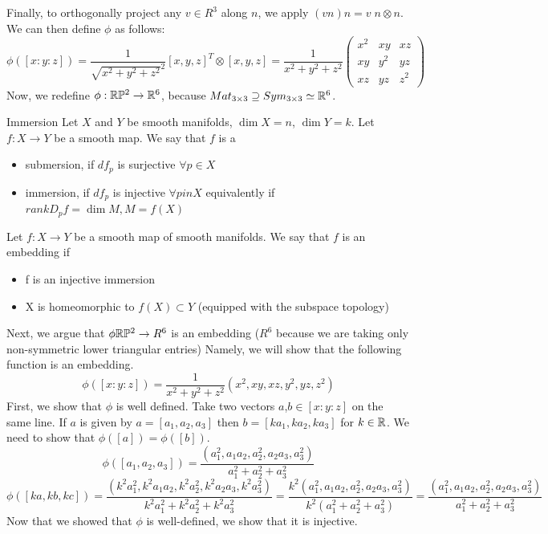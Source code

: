 \documentclass[11pt,a4paper]{report}
\begin{document}
Finally, to orthogonally project any $v \in R^3$ along $n$, we apply $(v n) n = v \; n \otimes n$. We can then define $\phi$ as follows:
$$ \phi([x:y:z])  = \frac{1}{\sqrt{x^2+y^2+z^2}^2} [x,y,z]^T \otimes [x,y,z] = \frac{1}{x^2 + y^2 + z^2} 
\begin{pmatrix}
x^2 & xy & xz \\
xy & y^2 & yz  \\
xz & yz & z^2
\end{pmatrix} $$
Now, we redefine $\phi: \mathbb{R} \mathbb{P} ^2 \to \mathbb{R}^6$, because  $Mat_{3 \times 3} \supseteq Sym_{3 \times 3} \simeq \mathbb{R}^6$.
\begin{defn}{Immersion}
Let $X$ and $Y$ be smooth manifolds, $\dim X =n $, $\dim Y = k$. Let $f : X \to Y$ be a smooth map.
We say that $f$ is a
\begin{itemize}
    \item submersion, if $df_p$ is surjective $\forall p \in X$
    \item immersion, if $df_p$ is injective $\forall p in X$ equivalently if $rank D_p f = \dim M, M=f(X)$
\end{itemize}
\end{defn}
\begin{defn}
    Let $f: X \to Y$ be a smooth map of smooth manifolds. We say that $f$ is an embedding if 
    \begin{itemize}
        \item f is an injective immersion
        \item X is homeomorphic to $f(X) \subset Y$ (equipped with the subspace topology)
    \end{itemize}
\end{defn}
Next, we argue that $\phi \mathbb{R} \mathbb{P} ^2 \to R^6$ is an embedding ($R^6$ because we are taking only non-symmetric lower triangular entries)
Namely, we will show that the following function is an embedding.
$$ \phi([x:y:z]) = \frac{1}{x^2+y^2+z^2} (x^2,xy, xz, y^2, yz, z^2) $$
First, we show that $\phi$ is well defined. Take two vectors $a$,$b \in [x:y:z]$ on the same line.
If $a$ is given by $a=[a_1,a_2,a_3]$ then $b = [k a_1, k a_2, k a_3]$ for $k \in \mathbb{R}$. We need to show that 
$\phi([a]) = \phi([b])$.
$$\phi([a_1,a_2,a_3]) = \frac{(a_1^2, a_1a_2, a_2^2, a_2a_3, a_3^2)}{a_1^2+a_2^2+a_3^2}$$
$$\phi([ka,kb,kc]) = 
\frac{(k^2 a_1^2, k^2 a_1a_2, k^2 a_2^2, k^2 a_2a_3, k^2 a_3^2)}{k^2 a_1^2+ k^2 a_2^2+ k^2 a_3^2} 
=  \frac{ k^2 (a_1^2, a_1 a_2, a_2^2, a_2a_3, a_3^2) }{ k^2 (a_1^2+a_2^2+a_3^2)  }
= \frac{(a_1^2, a_1a_2, a_2^2, a_2a_3, a_3^2)}{a_1^2+a_2^2+a_3^2} $$
Now that we showed that $\phi$ is well-defined, we show that it is injective.
\end{document}
